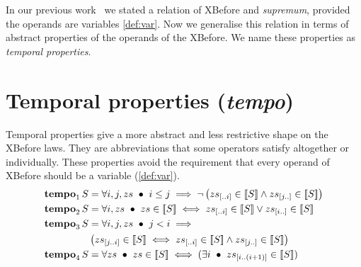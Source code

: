 \documentclass[12pt,openright,twoside,a4paper,oldfontcommands,english,brazil,final]{abntex2}
\theoremstyle{theo}
\newcommand{\sliceright}[2]{\ensuremath #1_{\left[..#2\right]}}
\newcommand{\sliceleft}[2]{\ensuremath #1_{\left[#2..\right]}}
\newcommand{\slice}[3]{\ensuremath #1_{\left[#2..#3\right]}}
\def\tempotext{tempo\xspace}
\def\tempoop{\ensuremath\operatorname{\mathbf{tempo}}}
\newcommand{\tempo}[2][1-4]{\ensuremath\tempoop_{#1} #2}
\newcommand{\denote}[1]{\ensuremath\left[\!\left[#1\right]\!\right]}
\begin{document}
In our previous work~\cite{DM2015} we stated a relation of \ac{XBefore} and \emph{supremum}, provided the operands are variables \cref{def:var}.
Now we generalise this relation in terms of abstract properties of the operands of the \ac{XBefore}.
We name these properties as \emph{temporal properties}.

\section{Temporal properties (\emph{\tempotext})}
\label{sec:temporal-properties}

Temporal properties give a more abstract and less restrictive shape on the \ac{XBefore} laws.
They are abbreviations that some operators satisfy altogether or individually.
These properties avoid the requirement that every operand of \ac{XBefore} should be a variable (\cref{def:var}).
%
\begin{subequations}
\begin{align}
\tempo[1]{S} &= \forall i, j, zs ~\bullet~
  i \le j \implies
  \lnot \left(
    \sliceright{zs}{i} \in \denote{S} \land \sliceleft{zs}{j} \in \denote{S}
  \right)\label{def:tempo1}\\
\tempo[2]{S} &= \forall i, zs ~\bullet~
  zs \in \denote{S} \iff
  \sliceright{zs}{i} \in \denote{S} \lor \sliceleft{zs}{i} \in \denote{S}\label{def:tempo2}\\
\tempo[3]{S} &= \forall i, j, zs ~\bullet~
  j < i \implies \nonumber\\
  &\left(
    \slice{zs}{j}{i} \in \denote{S} \iff \sliceright{zs}{i} \in \denote{S} \land \sliceleft{zs}{j} \in \denote{S}
  \right)\label{def:tempo3}\\
\tempo[4]{S} &= \forall zs ~\bullet~ zs \in \denote{S} \iff (\exists i ~\bullet~ \slice{zs}{i}{\left(i+1\right)} \in \denote{S})\label{def:tempo4}
\end{align}
\end{subequations}
\end{document}
